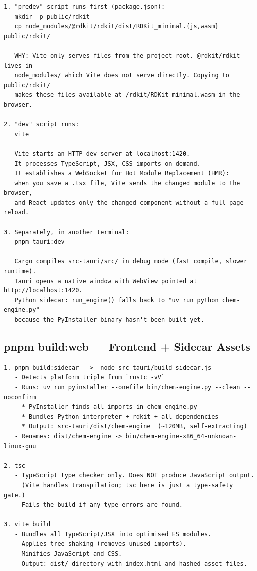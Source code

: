 \documentclass[11pt,a4paper]{article}
\begin{document}
\begin{lstlisting}[language={}]
1. "predev" script runs first (package.json):
   mkdir -p public/rdkit
   cp node_modules/@rdkit/rdkit/dist/RDKit_minimal.{js,wasm} public/rdkit/

   WHY: Vite only serves files from the project root. @rdkit/rdkit lives in
   node_modules/ which Vite does not serve directly. Copying to public/rdkit/
   makes these files available at /rdkit/RDKit_minimal.wasm in the browser.

2. "dev" script runs:
   vite

   Vite starts an HTTP dev server at localhost:1420.
   It processes TypeScript, JSX, CSS imports on demand.
   It establishes a WebSocket for Hot Module Replacement (HMR):
   when you save a .tsx file, Vite sends the changed module to the browser,
   and React updates only the changed component without a full page reload.

3. Separately, in another terminal:
   pnpm tauri:dev

   Cargo compiles src-tauri/src/ in debug mode (fast compile, slower runtime).
   Tauri opens a native window with WebView pointed at http://localhost:1420.
   Python sidecar: run_engine() falls back to "uv run python chem-engine.py"
   because the PyInstaller binary hasn't been built yet.
\end{lstlisting}

\subsection{pnpm build:web --- Frontend + Sidecar Assets}

\begin{lstlisting}[language={}]
1. pnpm build:sidecar  ->  node src-tauri/build-sidecar.js
   - Detects platform triple from `rustc -vV`
   - Runs: uv run pyinstaller --onefile bin/chem-engine.py --clean --noconfirm
     * PyInstaller finds all imports in chem-engine.py
     * Bundles Python interpreter + rdkit + all dependencies
     * Output: src-tauri/dist/chem-engine  (~120MB, self-extracting)
   - Renames: dist/chem-engine -> bin/chem-engine-x86_64-unknown-linux-gnu

2. tsc
   - TypeScript type checker only. Does NOT produce JavaScript output.
     (Vite handles transpilation; tsc here is just a type-safety gate.)
   - Fails the build if any type errors are found.

3. vite build
   - Bundles all TypeScript/JSX into optimised ES modules.
   - Applies tree-shaking (removes unused imports).
   - Minifies JavaScript and CSS.
   - Output: dist/ directory with index.html and hashed asset files.
\end{lstlisting}
\end{document}
